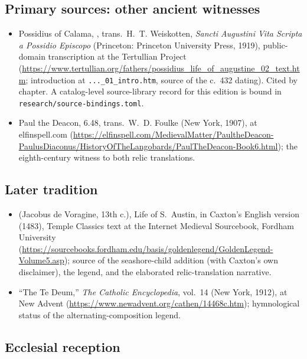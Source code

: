 \subsection*{Primary sources: other ancient witnesses}

\begin{itemize}
\item Possidius of Calama, , trans.\
H.~T. Weiskotten, \textit{Sancti Augustini Vita Scripta a Possidio
Episcopo} (Princeton: Princeton University Press, 1919), public-domain
transcription at the Tertullian Project
(\url{https://www.tertullian.org/fathers/possidius_life_of_augustine_02_text.htm};
introduction at \texttt{...\_01\_intro.htm}, source of the c.~432 dating).
Cited by chapter. A catalog-level source-library record for this edition is
bound in \texttt{research/source-bindings.toml}.
\item Paul the Deacon,  6.48, trans.\
W.~D. Foulke (New York, 1907), at elfinspell.com
(\url{https://elfinspell.com/MedievalMatter/PaultheDeacon-PaulusDiaconus/HistoryOfTheLangobards/PaulTheDeacon-Book6.html});
the eighth-century witness to both relic translations.
\end{itemize}

\subsection*{Later tradition}

\begin{itemize}
\item {} (Jacobus de Voragine, 13th c.), Life of
S.~Austin, in Caxton's English version (1483), Temple Classics text at the
Internet Medieval Sourcebook, Fordham University
(\url{https://sourcebooks.fordham.edu/basis/goldenlegend/GoldenLegend-Volume5.asp});
source of the seashore-child addition (with Caxton's own disclaimer), the
\work{Te Deum} legend, and the elaborated relic-translation narrative.
\item ``The Te Deum,'' \textit{The Catholic Encyclopedia}, vol.~14 (New
York, 1912), at New Advent
(\url{https://www.newadvent.org/cathen/14468c.htm}); hymnological status of
the alternating-composition legend.
\end{itemize}

\subsection*{Ecclesial reception}

